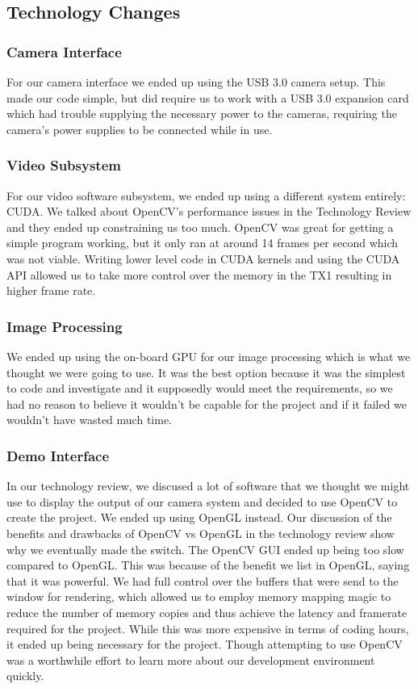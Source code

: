 \subsection{Technology Changes}
\subsubsection{Camera Interface}
For our camera interface we ended up using the USB 3.0 camera setup. This made our code simple, but did require us to work with a USB 3.0 expansion card which had trouble supplying the necessary power to the cameras, requiring the camera's power supplies to be connected while in use.
\subsubsection{Video Subsystem}
For our video software subsystem, we ended up using a different system entirely: CUDA. We talked about OpenCV's performance issues in the Technology Review and they ended up constraining us too much. OpenCV was great for getting a simple program working, but it only ran at around 14 frames per second which was not viable. Writing lower level code in CUDA kernels and using the CUDA API allowed us to take more control over the memory in the TX1 resulting in higher frame rate.
\subsubsection{Image Processing}
We ended up using the on-board GPU for our image processing which is what we thought we were going to use. It was the best option because it was the simplest to code and investigate and it supposedly would meet the requirements, so we had no reason to believe it wouldn't be capable for the project and if it failed we wouldn't have wasted much time.
\subsubsection{Demo Interface}
In our technology review, we discused a lot of software that we thought we might use to display the output of our camera system and decided to use OpenCV to create the project. We ended up using OpenGL instead. Our discussion of the benefits and drawbacks of OpenCV vs OpenGL in the technology review show why we eventually made the switch. The OpenCV GUI ended up being too slow compared to OpenGL. This was because of the benefit we list in OpenGL, saying that it was powerful. We had full control over the buffers that were send to the window for rendering, which allowed us to employ memory mapping magic to reduce the number of memory copies and thus achieve the latency and framerate required for the project. While this was more expensive in terms of coding hours, it ended up being necessary for the project. Though attempting to use OpenCV was a worthwhile effort to learn more about our development environment quickly.
